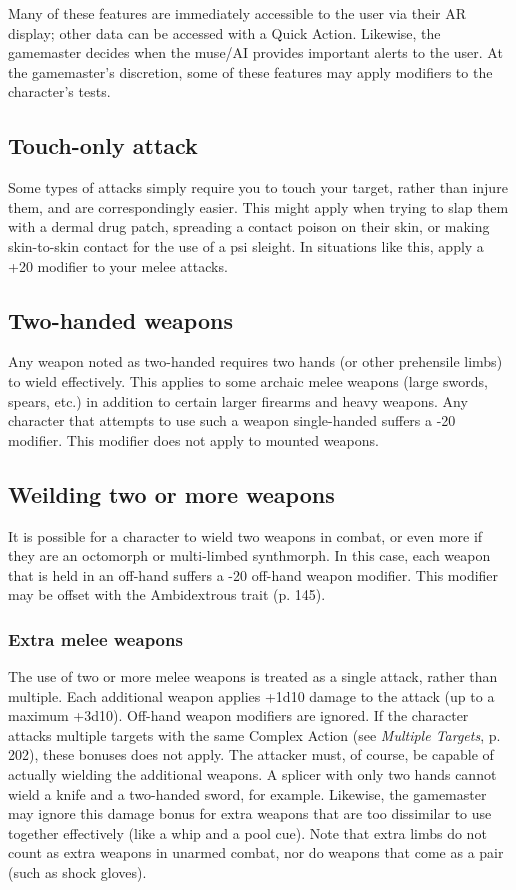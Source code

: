 Many of these features are immediately accessible to the user via their AR display; other data can be accessed with a Quick Action. Likewise, the gamemaster decides when the muse/AI provides important alerts to the user. At the gamemaster’s discretion, some of these features may apply modifiers to the character’s tests.


\subsection{Touch-only attack}
\label{sec:touch-only-attack} Some types of attacks simply require you to touch your target, rather than injure them, and are correspondingly easier. This might apply when trying to slap them with a dermal drug patch, spreading a contact poison on their skin, or making skin-to-skin contact for the use of a psi sleight. In situations like this, apply a +20 modifier to your melee attacks.


\subsection{Two-handed weapons}
\label{sec:two-handed-weapons}

Any weapon noted as two-handed requires two hands (or other prehensile limbs) to wield effectively. This applies to some archaic melee weapons (large swords, spears, etc.) in addition to certain larger firearms and heavy weapons. Any character that attempts to use such a weapon single-handed suffers a -20 modifier. This modifier does not apply to mounted weapons.


\subsection{Weilding two or more weapons}
\label{sec:weilding-two-or-more}

It is possible for a character to wield two weapons in combat, or even more if they are an octomorph or multi-limbed synthmorph. In this case, each weapon that is held in an off-hand suffers a -20 off-hand weapon modifier. This modifier may be offset with the Ambidextrous trait (p. 145).

\subsubsection{Extra melee weapons}

The use of two or more melee weapons is treated as a single attack, rather than multiple. Each additional weapon applies +1d10 damage to the attack (up to a maximum +3d10). Off-hand weapon modifiers are ignored. If the character attacks multiple targets with the same Complex Action (see \emph{Multiple Targets}, p. 202), these bonuses does not apply. The attacker must, of course, be capable of actually wielding the additional weapons. A splicer with only two hands cannot wield a knife and a two-handed sword, for example. Likewise, the gamemaster may ignore this damage bonus for extra weapons that are too dissimilar to use together effectively (like a whip and a pool cue). Note that extra limbs do not count as extra weapons in unarmed combat, nor do weapons that come as a pair (such as shock gloves).

